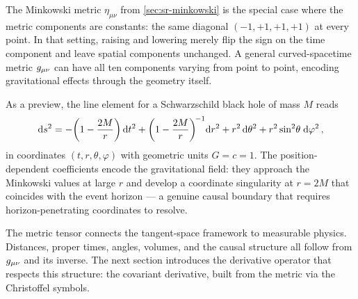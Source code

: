 The Minkowski metric $\eta_{\mu\nu}$ from \cref{sec:sr-minkowski} is the
special case where the metric components are constants: the same diagonal
$(-1, +1, +1, +1)$ at every point.  In that setting, raising and lowering
merely flip the sign on the time component and leave spatial components
unchanged.  A general curved-spacetime metric $g_{\mu\nu}$ can have all ten
components varying from point to point, encoding gravitational effects through
the geometry itself.

As a preview, the line element for a Schwarzschild black hole of mass $M$
reads
%
\begin{equation}
  \mathrm{d} s^2 = -\!\left(1 - \frac{2M}{r}\right)\mathrm{d} t^2
    + \left(1 - \frac{2M}{r}\right)^{\!-1}\!\mathrm{d} r^2
    + r^2\,\mathrm{d}\theta^2
    + r^2\sin^2\!\theta\;\mathrm{d}\varphi^2 \,,
  \label{eq:schwarzschild-preview}
\end{equation}
%
in coordinates $(t, r, \theta, \varphi)$ with geometric units $G = c = 1$.
The position-dependent coefficients encode the gravitational field: they
approach the Minkowski values at large $r$ and develop a coordinate singularity
at $r = 2M$ that coincides with the event horizon --- a genuine causal boundary
that requires horizon-penetrating coordinates to resolve.

The metric tensor connects the tangent-space framework to measurable physics.
Distances, proper times, angles, volumes, and the causal structure all follow
from $g_{\mu\nu}$ and its inverse.  The next section introduces the derivative
operator that respects this structure: the covariant derivative, built from the
metric via the Christoffel symbols.
